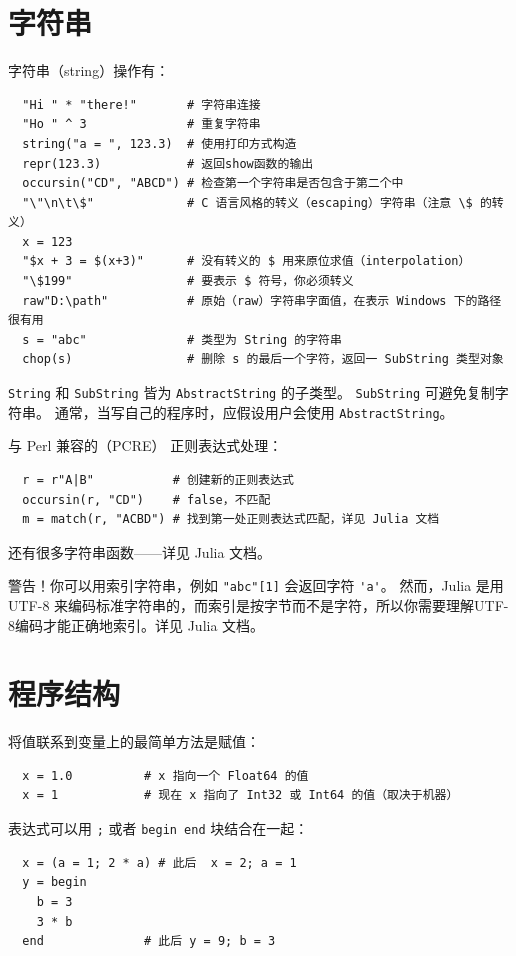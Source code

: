 \documentclass[10pt,a4paper]{article}
\begin{document}
\section{字符串}
字符串（string）操作有：
\begin{lstlisting}
  "Hi " * "there!"       # 字符串连接
  "Ho " ^ 3              # 重复字符串
  string("a = ", 123.3)  # 使用打印方式构造
  repr(123.3)            # 返回show函数的输出
  occursin("CD", "ABCD") # 检查第一个字符串是否包含于第二个中
  "\"\n\t\$"             # C 语言风格的转义（escaping）字符串（注意 \$ 的转义）
  x = 123
  "$x + 3 = $(x+3)"      # 没有转义的 $ 用来原位求值（interpolation）
  "\$199"                # 要表示 $ 符号，你必须转义
  raw"D:\path"           # 原始（raw）字符串字面值，在表示 Windows 下的路径很有用
  s = "abc"              # 类型为 String 的字符串
  chop(s)                # 删除 s 的最后一个字符，返回一 SubString 类型对象
\end{lstlisting}

\lstinline|String| 和 \lstinline|SubString| 皆为 \lstinline|AbstractString| 的子类型。
\lstinline|SubString| 可避免复制字符串。
通常，当写自己的程序时，应假设用户会使用 \lstinline|AbstractString|。

与 Perl 兼容的（PCRE） 正则表达式处理：
\begin{lstlisting}
  r = r"A|B"           # 创建新的正则表达式
  occursin(r, "CD")    # false，不匹配
  m = match(r, "ACBD") # 找到第一处正则表达式匹配，详见 Julia 文档
\end{lstlisting}

还有很多字符串函数——详见 Julia 文档。

警告！你可以用索引字符串，例如 \lstinline|"abc"[1]| 会返回字符 \lstinline|'a'|。
然而，Julia 是用 UTF-8 来编码标准字符串的，而索引是按字节而不是字符，所以你需要理解UTF-8编码才能正确地索引。详见 Julia 文档。

\section{程序结构}
将值联系到变量上的最简单方法是赋值：
\begin{lstlisting}
  x = 1.0          # x 指向一个 Float64 的值
  x = 1            # 现在 x 指向了 Int32 或 Int64 的值（取决于机器）
\end{lstlisting}

表达式可以用 \lstinline|;| 或者 \lstinline|begin end| 块结合在一起：
\begin{lstlisting}
  x = (a = 1; 2 * a) # 此后  x = 2; a = 1
  y = begin
    b = 3
    3 * b
  end              # 此后 y = 9; b = 3
\end{lstlisting}
\end{document}
